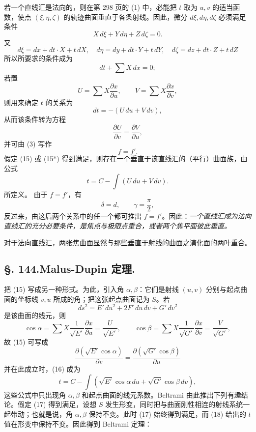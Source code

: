 若一个直线汇是法向的，则在第 298 页的 (1) 中，必能把 \(t\) 取为 \(u,v\) 的适当函数，使点 \((\xi,\eta,\zeta)\) 的轨迹曲面垂直于各条射线。因此，微分 \(d\xi,d\eta,d\zeta\) 必须满足条件
\[
 X\,d\xi+Y\,d\eta+Z\,d\zeta=0.
\]
又
\[
 d\xi=dx+dt\cdot X+t\,dX,
 \quad d\eta=dy+dt\cdot Y+t\,dY,
 \quad d\zeta=dz+dt\cdot Z+t\,dZ
\]
所以所要求的条件成为
\[
 dt+\sum X\,dx=0;
\]
若置
\begin{equation}\tag{14}
 U=\sum X\frac{\partial x}{\partial u},
 \qquad V=\sum X\frac{\partial x}{\partial v},
\end{equation}
则用来确定 \(t\) 的关系为
\[
 dt=-(U\,du+V\,dv),
\]
从而该条件转为方程
\begin{equation}\tag{15}
 \frac{\partial U}{\partial v}=\frac{\partial V}{\partial u},
\end{equation}
并可由 (3) 写作
\begin{equation}\tag{15*}
 f=f'.
\end{equation}
假定 (15) 或 (15*) 得到满足，则存在一个垂直于该直线汇的（平行）曲面族，由公式
\begin{equation}\tag{16}
 t=C-\int(U\,du+V\,dv).
\end{equation}
所定义。
由于 \(f=f'\)，有
\[
 \delta=d,
 \qquad \gamma=\frac\pi2,
\]
反过来，由这后两个关系中的任一个都可推出 \(f=f'\)。因此：\emph{一个直线汇成为法向直线汇的充分必要条件，是焦点与极限点重合，或者两个焦平面彼此垂直。}

对于法向直线汇，两张焦曲面显然与那些垂直于射线的曲面之演化面的两叶重合。

\subsection*{\S. 144.\quad Malus-Dupin 定理.}

把 (15) 写成另一种形式。为此，引入角 \(\alpha,\beta\)：它们是射线 \((u,v)\) 分别与起点曲面的坐标线 \(v,u\) 所成的角；把这张起点曲面记为 \(S\)。若
\[
 ds^2=E'\,du^2+2F'\,du\,dv+G'\,dv^2
\]
是该曲面的线元，则
\[
 \cos\alpha=\sum X\frac1{\sqrt{E'}}\frac{\partial x}{\partial u}=\frac{U}{\sqrt{E'}},
 \qquad
 \cos\beta=\sum X\frac1{\sqrt{G'}}\frac{\partial x}{\partial v}=\frac{V}{\sqrt{G'}},
\]
故 (15) 可写成
\begin{equation}\tag{17}
 \frac{\partial(\sqrt{E'}\cos\alpha)}{\partial v}
 =
 \frac{\partial(\sqrt{G'}\cos\beta)}{\partial u}
\end{equation}
并在此成立时，(16) 成为
\begin{equation}\tag{18}
 t=C-\int\left(\sqrt{E'}\cos\alpha\,du+\sqrt{G'}\cos\beta\,dv\right),
\end{equation}
这些公式中只出现角 \(\alpha,\beta\) 和起点曲面的线元系数。Beltrami 由此推出下列有趣结论。假定 (17) 得到满足，设想 \(S\) 发生形变，同时把与曲面刚性相连的射线系统一起带动；也就是说，角 \(\alpha,\beta\) 保持不变。此时 (17) 始终得到满足，而 (18) 给出的 \(t\) 值在形变中保持不变。因此得到 Beltrami 定理：

